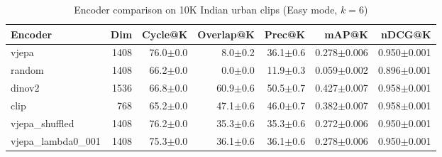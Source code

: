 \begin{table}[ht]
\centering
\caption{Encoder comparison on 10K Indian urban clips (Easy mode, $k=6$)}
\label{tab:encoder_comparison}
\begin{tabular}{lrrrrrr}
\toprule
Encoder & Dim & Cycle@K & Overlap@K & Prec@K & mAP@K & nDCG@K \\
\midrule
vjepa & 1408 & 76.0{\tiny$\pm$0.0} & 8.0{\tiny$\pm$0.2} & 36.1{\tiny$\pm$0.6} & 0.278{\tiny$\pm$0.006} & 0.950{\tiny$\pm$0.001} \\
random & 1408 & 66.2{\tiny$\pm$0.0} & 0.0{\tiny$\pm$0.0} & 11.9{\tiny$\pm$0.3} & 0.059{\tiny$\pm$0.002} & 0.896{\tiny$\pm$0.001} \\
dinov2 & 1536 & 66.8{\tiny$\pm$0.0} & 60.9{\tiny$\pm$0.6} & 50.5{\tiny$\pm$0.7} & 0.427{\tiny$\pm$0.007} & 0.958{\tiny$\pm$0.001} \\
clip & 768 & 65.2{\tiny$\pm$0.0} & 47.1{\tiny$\pm$0.6} & 46.0{\tiny$\pm$0.7} & 0.382{\tiny$\pm$0.007} & 0.958{\tiny$\pm$0.001} \\
vjepa\_shuffled & 1408 & 76.2{\tiny$\pm$0.0} & 35.3{\tiny$\pm$0.6} & 35.3{\tiny$\pm$0.6} & 0.272{\tiny$\pm$0.006} & 0.950{\tiny$\pm$0.001} \\
vjepa\_lambda0\_001 & 1408 & 75.3{\tiny$\pm$0.0} & 36.1{\tiny$\pm$0.6} & 36.1{\tiny$\pm$0.6} & 0.278{\tiny$\pm$0.006} & 0.950{\tiny$\pm$0.001} \\
\bottomrule
\end{tabular}
\end{table}